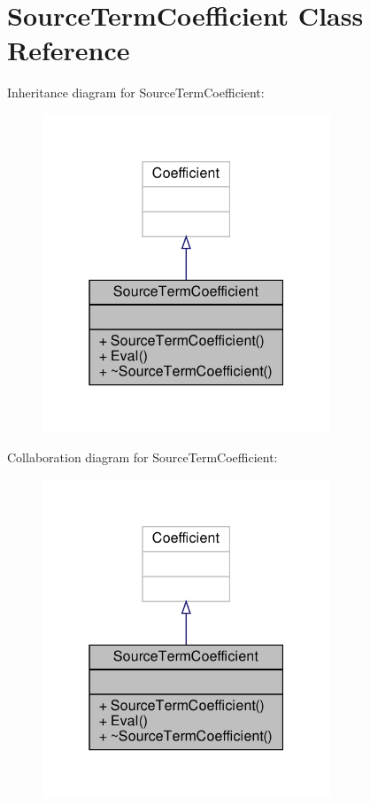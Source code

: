\hypertarget{classSourceTermCoefficient}{}\section{Source\+Term\+Coefficient Class Reference}
\label{classSourceTermCoefficient}


Inheritance diagram for Source\+Term\+Coefficient\+:\nopagebreak
\begin{figure}[H]
\begin{center}
\leavevmode
\includegraphics[width=244pt]{classSourceTermCoefficient__inherit__graph}
\end{center}
\end{figure}


Collaboration diagram for Source\+Term\+Coefficient\+:\nopagebreak
\begin{figure}[H]
\begin{center}
\leavevmode
\includegraphics[width=244pt]{classSourceTermCoefficient__coll__graph}
\end{center}
\end{figure}
